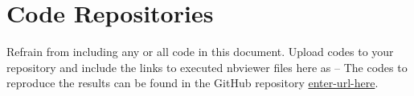 \documentclass[12pt, a4 paper]{article}
\begin{document}

\appendix
\section{Code Repositories}
Refrain from including any or all code in this document. Upload codes to your repository and include the links to executed nbviewer files here as -- The codes to reproduce the results can be found in the GitHub repository \url{enter-url-here}.
\end{document}
